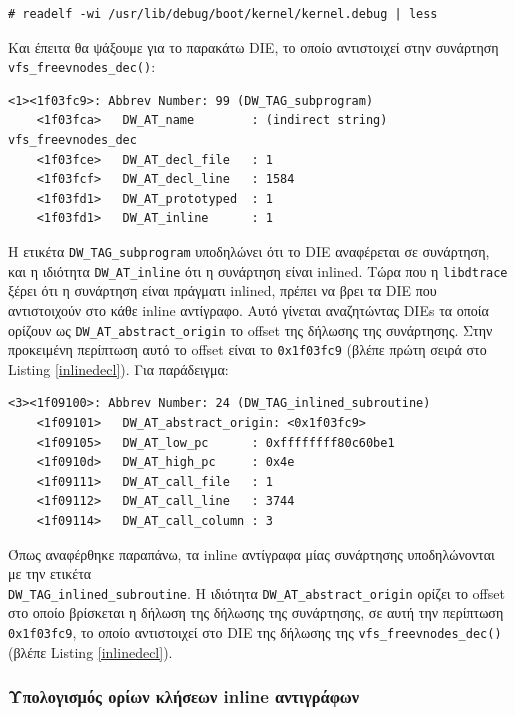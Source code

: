 \documentclass[12pt]{article}
\begin{document}
\begin{lstlisting}
# readelf -wi /usr/lib/debug/boot/kernel/kernel.debug | less
\end{lstlisting}

Και έπειτα θα ψάξουμε για το παρακάτω DIE, το οποίο αντιστοιχεί στην συνάρτηση
\lstinline{vfs_freevnodes_dec()}:

\begin{lstlisting}[caption={DIE δήλωησης inline συνάρτησης}, captionpos=b, label=inlinedecl]
 <1><1f03fc9>: Abbrev Number: 99 (DW_TAG_subprogram)
    <1f03fca>   DW_AT_name        : (indirect string) vfs_freevnodes_dec
    <1f03fce>   DW_AT_decl_file   : 1
    <1f03fcf>   DW_AT_decl_line   : 1584
    <1f03fd1>   DW_AT_prototyped  : 1
    <1f03fd1>   DW_AT_inline      : 1
\end{lstlisting}

Η ετικέτα \lstinline{DW_TAG_subprogram} υποδηλώνει ότι το DIE αναφέρεται σε
συνάρτηση, και η ιδιότητα \lstinline{DW_AT_inline} ότι η συνάρτηση είναι
inlined. Τώρα που η \lstinline{libdtrace} ξέρει ότι η συνάρτηση είναι πράγματι
inlined, πρέπει να βρει τα DIE που αντιστοιχούν στο κάθε inline αντίγραφο. Αυτό
γίνεται αναζητώντας DIEs τα οποία ορίζουν ως \lstinline{DW_AT_abstract_origin}
το offset της δήλωσης της συνάρτησης. Στην προκειμένη περίπτωση αυτό το offset
είναι το \lstinline{0x1f03fc9} (βλέπε πρώτη σειρά στο Listing
\ref{inlinedecl}). Για παράδειγμα:

\begin{lstlisting}[caption={DIE αντιγράφου inline συνάρτησης}, captionpos=b]
 <3><1f09100>: Abbrev Number: 24 (DW_TAG_inlined_subroutine)
    <1f09101>   DW_AT_abstract_origin: <0x1f03fc9>
    <1f09105>   DW_AT_low_pc      : 0xffffffff80c60be1
    <1f0910d>   DW_AT_high_pc     : 0x4e
    <1f09111>   DW_AT_call_file   : 1
    <1f09112>   DW_AT_call_line   : 3744
    <1f09114>   DW_AT_call_column : 3
\end{lstlisting}

Όπως αναφέρθηκε παραπάνω, τα inline αντίγραφα μίας συνάρτησης υποδηλώνονται με
την ετικέτα \\
\lstinline{DW_TAG_inlined_subroutine}. Η ιδιότητα
\lstinline{DW_AT_abstract_origin} ορίζει το offset στο οποίο βρίσκεται η δήλωση
της δήλωσης της συνάρτησης, σε αυτή την περίπτωση \lstinline{0x1f03fc9}, το
οποίο αντιστοιχεί στο DIE της δήλωσης της \lstinline{vfs_freevnodes_dec()}
(βλέπε Listing \ref{inlinedecl}).

\subsubsection{Υπολογισμός ορίων κλήσεων inline αντιγράφων} \label{bounds}
\end{document}
